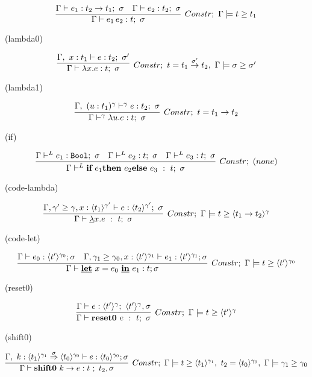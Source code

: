 \[
  \infer[Constr;~\Gamma \models \longer{t}{t_1}]
  {\Gamma \vdash e_1 \, e_2 : t;~\sigma}
  {\Gamma \vdash e_1 : t_2 \to t_1;~\sigma
    &\Gamma \vdash e_2 : t_2;~\sigma
  }
\]

(lambda0)

\[
  \infer[Constr;~t=\funT{t_1}{t_2}{\sigma'},~ \Gamma \models \sigma \ord \sigma' ]
  {\Gamma \vdash \lambda x.e : t;~\sigma}
  {\Gamma,~x:t_1 \vdash e : t_2;~\sigma'}
\]

(lambda1)

\[
  \infer[Constr;~t=\funT{t_1}{t_2}{}]
  {\Gamma \vdash^\gamma \lambda u.e : t;~\sigma}
  {\Gamma,~(u:t_1)^\gamma \vdash^\gamma e : t_2;~\sigma}
\]

(if)

\[
  \infer[Constr;~(none)]
  {\Gamma \vdash^L
    \textbf{if}~e_1 \textbf{then}~e_2 \textbf{else}~e_3 ~:~t; ~ \sigma}
  {\Gamma \vdash^L e_1 : \Bool;~\sigma
    &\Gamma \vdash^L e_2 : t;~\sigma
    &\Gamma \vdash^L e_3 : t;~\sigma
  }
\]

(code-lambda)

\[
  \infer[Constr;~\Gamma \models \longer{t}{\codeT{t_1 \to t_2}{\gamma}}]
  {\Gamma \vdash \underline{\lambda}x.e ~:~t;~\sigma}
  {\Gamma,\longer{\gamma'}{\gamma},x:\codeT{t_1}{\gamma'}
    \vdash e : \codeT{t_2}{\gamma'};~\sigma
  }
\]

(code-let)

\[
  \infer[Constr;~\Gamma \models \longer{t}{\codeT{t'}{\gamma_0}}]
  {\Gamma \vdash \cLet~ x = e_0~ \cIn~ e_1 : t ; \sigma}
  { \Gamma \vdash e_0 : \codeT{t'}{\gamma_0} ; \sigma
    &\Gamma, \longer{\gamma_1}{\gamma_0}, x: \codeT{t'}{\gamma_1} \vdash e_1 : \codeT{t'}{\gamma_1} ; \sigma
  }
\]

(reset0)

\[
  \infer[Constr;~\Gamma \models \longer{t}{\codeT{t'}{\gamma}}]
  {\Gamma \vdash \Resetz~e ~:~ t; ~\sigma}
  {\Gamma \vdash e:\codeT{t'}{\gamma};~\codeT{t'}{\gamma},\sigma
  }
\]

(shift0)

\[
  \infer[Constr;~\Gamma \models \longer{t}{\codeT{t_1}{\gamma_1}},~ t_2 =\codeT{t_0}{\gamma_0},~ \Gamma \models \longer{\gamma_1}{\gamma_0}]
  {\Gamma \vdash \shiftz{k}{e} : t~;~ t_2,\sigma}
  {\Gamma,~k:\contT{\codeT{t_1}{\gamma_1}}{\codeT{t_0}{\gamma_0}}{\sigma}
    \vdash e : \codeT{t_0}{\gamma_0} ; \sigma
  }
\]


